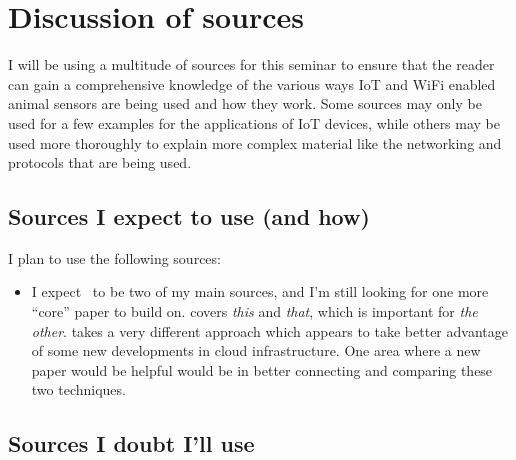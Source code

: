 \documentclass[sigplan,screen,nonacm]{acmart}
\begin{document}
\section{Discussion of sources}

I will be using a multitude of sources for this seminar to ensure that the reader can gain a comprehensive knowledge of the various ways IoT and WiFi enabled animal sensors are being used and how they work. Some sources may only be used for a few examples for the applications of IoT devices, while others may be used more thoroughly to explain more complex material like the networking and protocols that are being used.

\subsection{Sources I expect to use (and how)}

I plan to use the following sources:
\begin{itemize}
\item I expect~\cite{wild2023multi} to be two of my main sources, and I'm still looking for
	one more ``core'' paper to build on. \cite{OM:2008} covers \emph{this} and \emph{that}, which is important
	for \emph{the other}. \cite{prakash2013fractional} takes a very different approach which appears to take
	better advantage of some new developments in cloud infrastructure. One area where a new paper would be
	helpful would be in better connecting and comparing these two techniques.
\end{itemize}

\subsection{Sources I doubt I'll use}


\end{document}
